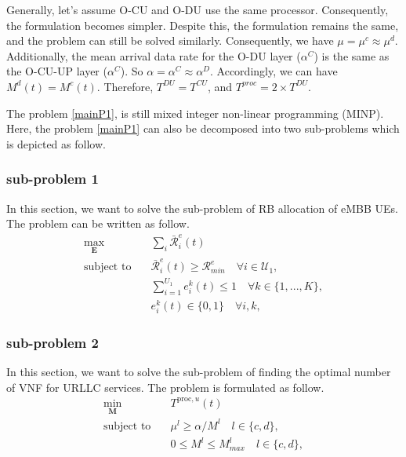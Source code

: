\documentclass[conference]{IEEEtran}
\begin{document}
Generally, let's assume O-CU and O-DU use the same processor. 
Consequently, the formulation becomes simpler. Despite this, the formulation remains the same, and the problem can still be solved similarly. 
Consequently, we have $\mu = \mu^c \approx \mu^d $. Additionally, the mean arrival data rate for the O-DU layer ($\alpha^C$) is the same as the O-CU-UP layer ($\alpha^C$). So $\alpha = \alpha^C \approx \alpha^D$. 
Accordingly, we can have $M^d(t) = M^c(t)$. Therefore, $T^{DU} = T^{CU}$, and $T^{proc} =2\times T^{DU}$.

The problem \eqref{mainP1}, is still mixed integer non-linear programming (MINP). Here, the problem \eqref{mainP1}
can also be decomposed into two sub-problems which is depicted as follow.
\subsubsection{sub-problem 1}
In this section, we want to solve the sub-problem of RB allocation of eMBB UEs.
The problem can be written as follow.
\begin{subequations} \label{mainP11}
\begin{alignat}{4}
\max\limits_{ \boldsymbol{E} } &  \sum_i \bar{\mathcal{R}}_{i}^e(t)       \ \\
\text{subject to} \quad  & \bar{\mathcal{R}}_{i}^e(t) \geq  \mathcal{R}_{min}^e \quad \forall i \in \mathcal{U}_1, \label{p11} \\
&\sum_{i=1}^{U_1}e^k_i(t)\leq 1 \quad \forall k \in \{1,...,K\},\label{p115} \\
&e^k_i(t)\in \{0,1\}  \quad \forall i,k, \label{p116} 
\end{alignat}
\label{constraints}
\end{subequations}
\subsubsection{sub-problem 2}
In this section, we want to solve the sub-problem of finding the optimal number of VNF for URLLC services.
The problem is formulated as follow.
\begin{subequations} \label{mainP2}
\begin{alignat}{4}
\min\limits_{ \boldsymbol{M} } &  T^{\text{proc}, u}(t)       \ \\
\text{subject to} \quad  & \mu^l \geq \alpha/M^l \quad l \in \{c,d\},\label{p28} \\
& 0 \leq M^l \leq M_{max}^l  \quad l \in \{c,d\},\label{p210}
\end{alignat}
\label{constraints}
\end{subequations}
\end{document}
